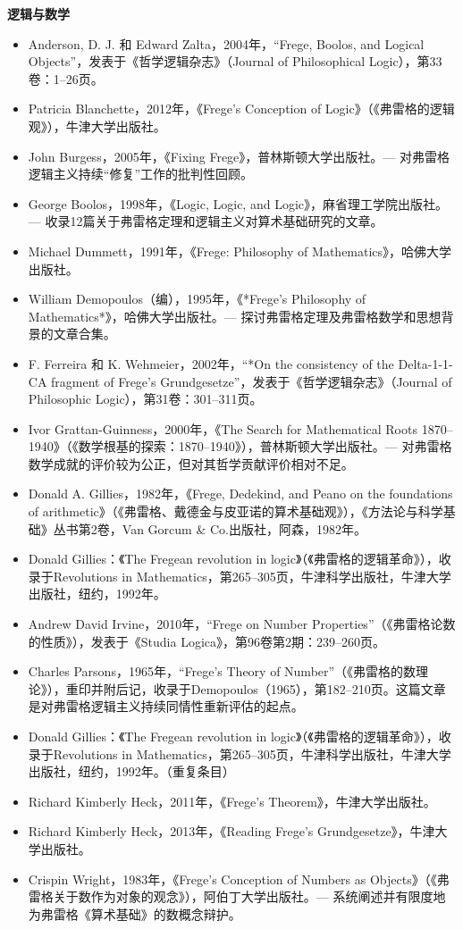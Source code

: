 \textbf{逻辑与数学} 

\begin{itemize}
\item Anderson, D. J. 和 Edward Zalta，2004年，“Frege, Boolos, and Logical Objects”，发表于《哲学逻辑杂志》（Journal of Philosophical Logic），第33卷：1–26页。  
\item Patricia Blanchette，2012年，《Frege's Conception of Logic》（《弗雷格的逻辑观》），牛津大学出版社。  
\item John Burgess，2005年，《Fixing Frege》，普林斯顿大学出版社。— 对弗雷格逻辑主义持续“修复”工作的批判性回顾。  
\item George Boolos，1998年，《Logic, Logic, and Logic》，麻省理工学院出版社。— 收录12篇关于弗雷格定理和逻辑主义对算术基础研究的文章。  
\item Michael Dummett，1991年，《Frege: Philosophy of Mathematics》，哈佛大学出版社。  
\item William Demopoulos（编），1995年，《*Frege's Philosophy of Mathematics*》，哈佛大学出版社。— 探讨弗雷格定理及弗雷格数学和思想背景的文章合集。  
\item F. Ferreira 和 K. Wehmeier，2002年，“*On the consistency of the Delta-1-1-CA fragment of Frege's Grundgesetze”，发表于《哲学逻辑杂志》（Journal of Philosophic Logic），第31卷：301–311页。  
\item Ivor Grattan-Guinness，2000年，《The Search for Mathematical Roots 1870–1940》（《数学根基的探索：1870–1940》），普林斯顿大学出版社。— 对弗雷格数学成就的评价较为公正，但对其哲学贡献评价相对不足。
\item Donald A. Gillies，1982年，《Frege, Dedekind, and Peano on the foundations of arithmetic》（《弗雷格、戴德金与皮亚诺的算术基础观》），《方法论与科学基础》丛书第2卷，Van Gorcum & Co.出版社，阿森，1982年。  
\item Donald Gillies：《The Fregean revolution in logic》（《弗雷格的逻辑革命》），收录于Revolutions in Mathematics，第265–305页，牛津科学出版社，牛津大学出版社，纽约，1992年。  
\item Andrew David Irvine，2010年，“Frege on Number Properties”（《弗雷格论数的性质》），发表于《Studia Logica》，第96卷第2期：239–260页。  
\item Charles Parsons，1965年，“Frege’s Theory of Number”（《弗雷格的数理论》），重印并附后记，收录于Demopoulos（1965），第182–210页。这篇文章是对弗雷格逻辑主义持续同情性重新评估的起点。  
\item Donald Gillies：《The Fregean revolution in logic》（《弗雷格的逻辑革命》），收录于Revolutions in Mathematics，第265–305页，牛津科学出版社，牛津大学出版社，纽约，1992年。（重复条目）  
\item Richard Kimberly Heck，2011年，《Frege’s Theorem》，牛津大学出版社。  
\item Richard Kimberly Heck，2013年，《Reading Frege’s Grundgesetze》，牛津大学出版社。  
\item Crispin Wright，1983年，《Frege's Conception of Numbers as Objects》（《弗雷格关于数作为对象的观念》），阿伯丁大学出版社。— 系统阐述并有限度地为弗雷格《算术基础》的数概念辩护。
\end{itemize}
